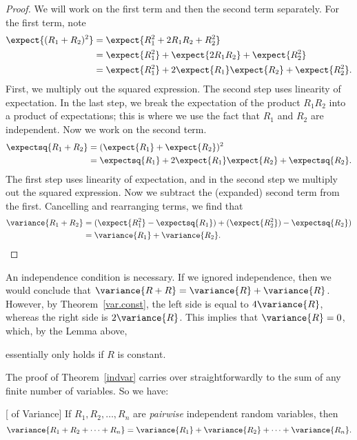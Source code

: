 \begin{proof}
We will work on the first term and then the second term separately.
For the first term, note
\begin{align*}
\expect{(R_1+R_2)^2}
    & = \expect{R_1^2 + 2 R_1 R_2 + R_2^2} \\
    & = \expect{R_1^2} + \expect{2 R_1 R_2} + \expect{R_2^2} \\
    & = \expect{R_1^2} + 2 \expect{R_1} \expect{R_2} + \expect{R_2^2}.
\end{align*}
First, we multiply out the squared expression.  The second step uses
linearity of expectation.  In the last step, we break the
expectation of the product $R_1 R_2$ into a product of expectations;
this is where we use the fact that $R_1$ and $R_2$ are independent.
Now we work on the second term.
\begin{align*}
\expectsq{R_1+R_2}
    & = (\expect{R_1} + \expect{R_2})^2 \\
    & = \expectsq{R_1} + 2 \expect{R_1} \expect{R_2} + \expectsq{R_2}.
\end{align*}
The first step uses linearity of expectation, and in the second step
we multiply out the squared expression.  Now we subtract the
(expanded) second term from the first. Cancelling and rearranging
terms, we find that
\begin{align*}
\variance{R_1 + R_2}
    & = (\expect{R_1^2} - \expectsq{R_1}) + (\expect{R_2^2}) - \expectsq{R_2}) \\
    & = \variance{R_1} + \variance{R_2}.
\end{align*}
\fi
\end{proof}

An independence condition is necessary.  If we ignored independence, then
we would conclude that $\variance{R + R} = \variance{R} + \variance{R}$.
However, by Theorem~\ref{var.const}, the left side is equal to $4
\variance{R}$, whereas the right side is $2 \variance{R}$.  This implies
that $\variance{R}=0$, which, by the Lemma above,
\iffalse Lemma~\ref{zvar}\fi
essentially only holds if $R$ is constant.

The proof of Theorem~\ref{indvar} carries over straightforwardly to
the sum of any finite number of variables.  So we have:

\begin{theorem}\label{th:varsum}[ of
  Variance]
  If $R_1, R_2, \dots, R_n$ are 
  \emph{pairwise} independent random variables, then
\begin{equation}\label{vsum}
\variance{R_1 + R_2 + \cdots + R_n} = \variance{R_1} + \variance{R_2} +
  \cdots + \variance{R_n}.
\end{equation}
\end{theorem}


